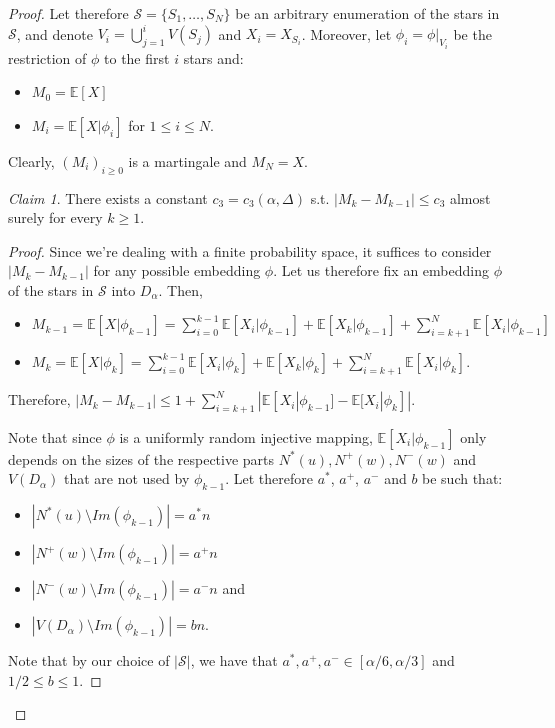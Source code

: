 \documentclass[10pt, a4paper]{article}
\theoremstyle{remark}
\newtheorem{claim}{Claim}
\newcommand*{\E}{\ensuremath{\mathbb{E}}}
\begin{document}
\begin{proof}
    Let therefore $\mathcal{S} = \{S_1, \dots, S_N \}$ be an arbitrary enumeration of the stars in $\mathcal{S}$, and denote $V_i = \bigcup_{j=1}^i V(S_j)$ and $X_i = X_{S_i}$.
    Moreover, let $\phi_i = \phi|_{V_i}$ be the restriction of $\phi$ to the first $i$ stars and:
    \begin{itemize}
        \item $M_0 = \E[X]$
        \item $M_i = \E[X | \phi_i]$ for $1 \leq i \leq N.$
    \end{itemize}
    Clearly, $(M_i)_{i \geq 0}$ is a martingale and $M_N = X$.

    \vspace{10pt}
    
    \begin{claim}
        There exists a constant $c_3 = c_3(\alpha, \Delta)$ s.t. $|M_k - M_{k-1}| \leq c_3$ almost surely for every $k \geq 1$.
    \end{claim}
    \begin{proof}
        Since we're dealing with a finite probability space, it suffices to consider $|M_k - M_{k-1}|$ for any possible embedding $\phi$.
        Let us therefore fix an embedding $\phi$ of the stars in $\mathcal{S}$ into $D_{\alpha}$.
        Then,
        \begin{itemize}
            \item $M_{k-1} = \E[X | \phi_{k-1}] = \sum_{i=0}^{k-1}\E[X_i | \phi_{k-1}] + \E[X_k | \phi_{k-1}] + \sum_{i=k+1}^{N}  \E[X_i | \phi_{k-1}]$
            \item $M_{k} = \E[X | \phi_{k}] = \sum_{i=0}^{k-1}\E[X_i | \phi_{k}] + \E[X_k | \phi_{k}] + \sum_{i=k+1}^{N}  \E[X_i | \phi_{k}].$
        \end{itemize}
        Therefore, $|M_{k} - M_{k-1}| \leq 1 + \sum_{i=k+1}^{N}|\E[X_i | \phi_{k-1}] - \E[X_i| \phi_{k}]|$.
        
        Note that since $\phi$ is a uniformly random injective mapping,
        $\E[X_i | \phi_{k-1}]$ only depends on the sizes of the respective parts $N^*(u), N^+(w), N^-(w)$ and $V(D_{\alpha})$ that are not used by $\phi_{k-1}$.
        Let therefore $a^*$, $a^+$,  $a^-$ and $b$ be such that:
        
        \begin{itemize}
            \item $|N^*(u)\setminus Im(\phi_{k-1})| = a^*n$
            \item $|N^+(w)\setminus Im(\phi_{k-1})| = a^+n$
            \item $|N^-(w)\setminus Im(\phi_{k-1})| = a^-n$ and
            \item $|V(D_{\alpha})\setminus Im(\phi_{k-1})| = b n.$
        \end{itemize}
        Note that by our choice of $|\mathcal{S}|$, we have that $a^*, a^+, a^- \in [\alpha/6, \alpha/3]$ and $1/2 \leq b \leq 1$.


\end{proof}
\end{proof}
\end{document}
